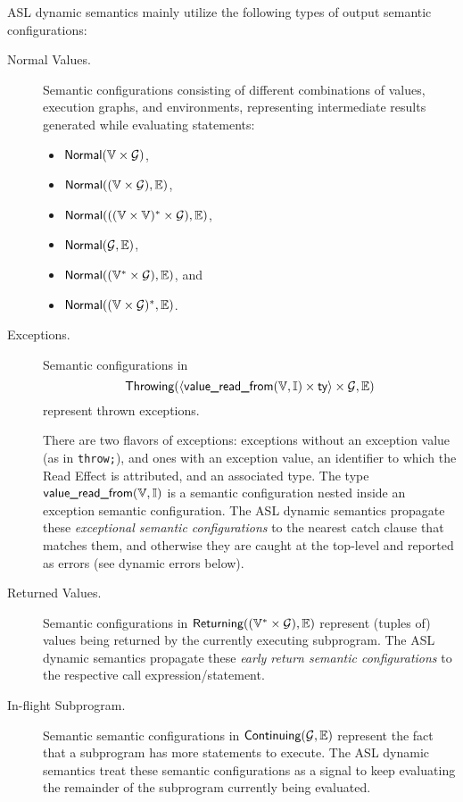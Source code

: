 ASL dynamic semantics mainly utilize the following types of output semantic configurations:
\begin{description}
  \item[Normal Values.] \hypertarget{def-normal}{}
  Semantic configurations consisting of different combinations of values,
  execution graphs, and environments, representing intermediate results
  generated while evaluating statements:
  \begin{itemize}
  \item $\textsf{Normal}(\mathbb{V} \times \mathcal{G})$,
  \item $\textsf{Normal}((\mathbb{V} \times \mathcal{G}), \mathbb{E})$,
  \item $\textsf{Normal}(((\mathbb{V} \times \mathbb{V})^* \times \mathcal{G}), \mathbb{E})$,
  \item $\textsf{Normal}(\mathcal{G}, \mathbb{E})$,
  \item $\textsf{Normal}((\mathbb{V}^* \times \mathcal{G}), \mathbb{E})$, and
  \item $\textsf{Normal}((\mathbb{V}\times\mathcal{G})^*, \mathbb{E})$.
  \end{itemize}

  \hypertarget{def-throwing}{}
  \item[Exceptions.] Semantic configurations in
  \[
    \textsf{Throwing}(\langle \textsf{value\_read\_from}(\mathbb{V},\mathbb{I}) \times \textsf{ty}\rangle \times \mathcal{G}, \mathbb{E})
  \]
  represent thrown exceptions.
  \hypertarget{def-valuereadfrom}{}

  There are two flavors of exceptions:
  exceptions without an exception value (as in \texttt{throw;}), and ones with an exception value,
  an identifier to which the Read Effect is attributed, and an associated type.
  The type $\textsf{value\_read\_from}(\mathbb{V},\mathbb{I})$ is a semantic configuration nested inside an exception semantic configuration.
  The ASL dynamic semantics propagate these \emph{exceptional semantic configurations} to the nearest catch clause that matches
  them, and otherwise they are caught at the top-level and reported as errors (see dynamic errors below).

  \hypertarget{def-returning}{}
  \item[Returned Values.] Semantic configurations in $\textsf{Returning}((\mathbb{V}^* \times \mathcal{G}), \mathbb{E})$
  represent (tuples of) values being returned by the currently executing subprogram.
  The ASL dynamic semantics propagate these \emph{early return semantic configurations} to the respective call expression/statement.

  \hypertarget{def-continuing}{}
  \item[In-flight Subprogram.] Semantic semantic configurations in $\textsf{Continuing}(\mathcal{G}, \mathbb{E})$
  represent the fact that a subprogram has more statements to execute.
  The ASL dynamic semantics treat these semantic configurations as a signal to keep evaluating the remainder
  of the subprogram currently being evaluated.


\end{description}
